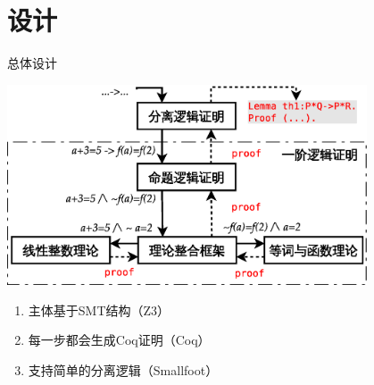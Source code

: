 \documentclass{beamer}
\begin{document}
\section{设计}
\begin{frame}[fragile]
  \begin{block}{总体设计}
    \begin{center}
    \includegraphics[width=0.8\textwidth]{stru.eps}
    \end{center}
  \end{block}
  \begin{block}{}
    \begin{enumerate}
      \item 主体基于SMT结构（Z3）
      \item 每一步都会生成Coq证明（Coq）
      \item 支持简单的分离逻辑（Smallfoot）
    \end{enumerate}
  \end{block}
\end{frame}
\end{document}
